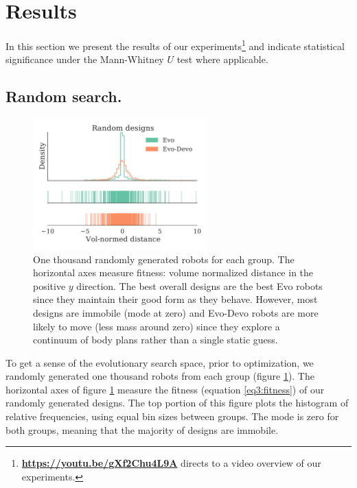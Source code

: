 \section{Results}
\label{sec3:results}


In this section we present the results of our experiments\footnote{\href{https://youtu.be/gXf2Chu4L9A}{\color{blue}\textbf{https://youtu.be/gXf2Chu4L9A}} directs to a video overview of our experiments.} and indicate statistical significance under the Mann-Whitney $U$ test where applicable. 




\subsection*{Random search.}


\begin{figure}[t]
\centering
\includegraphics[width=0.6\textwidth]{Chapter03/img/random_distributions_gecco}
\caption{\label{fig:random} One thousand randomly generated robots for each group. 
The horizontal axes measure fitness: volume normalized distance in the positive $y$ direction.
The best overall designs are the best Evo robots since they maintain their good form as they behave. However, most designs are immobile (mode at zero) and Evo-Devo robots are more likely to move (less mass around zero) since they explore a continuum of body plans rather than a single static guess.}
\end{figure}


To get a sense of the evolutionary search space, prior to optimization, we randomly generated one thousand robots from each group (figure \ref{fig:random}).
The horizontal axes of figure \ref{fig:random} measure the fitness (equation \ref{eq3:fitness}) of our randomly generated designs.
The top portion of this figure plots the histogram of relative frequencies, using equal bin sizes between groups.
The mode is zero for both groups, meaning that the majority of designs are immobile.

